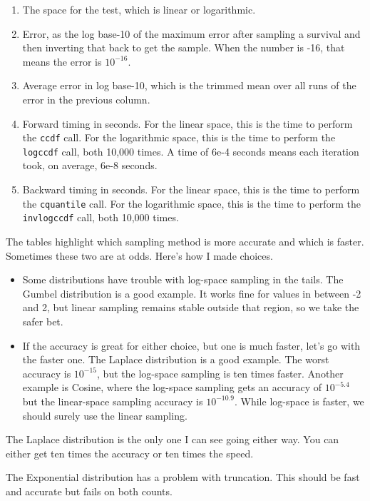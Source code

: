 \documentclass{article}
\begin{document}
\begin{enumerate}
	\item The space for the test, which is linear or logarithmic.

	\item Error, as the log base-10 of the maximum error after sampling a survival and then inverting that back to get the sample. When the number is -16, that means the error is $10^{-16}$.

	\item Average error in log base-10, which is the trimmed mean over all runs of the error in the previous column.

	\item Forward timing in seconds. For the linear space, this is the time to perform the \texttt{ccdf} call. For the logarithmic space, this is the time to perform the \texttt{logccdf} call, both 10,000 times. A time of 6e-4 seconds means each iteration took, on average, 6e-8 seconds.

	\item Backward timing in seconds. For the linear space, this is the time to perform the \texttt{cquantile} call. For the logarithmic space, this is the time to perform the \texttt{invlogccdf} call, both 10,000 times.
\end{enumerate}

\pagebreak


\pagebreak


\pagebreak


The tables highlight which sampling method is more accurate and which is faster. Sometimes these two are at odds. Here's how I made choices.

\begin{itemize}
	\item Some distributions have trouble with log-space sampling in the tails. The Gumbel distribution is a good example. It works fine for values in between -2 and 2, but linear sampling remains stable outside that region, so we take the safer bet.

	\item If the accuracy is great for either choice, but one is much faster, let's go with the faster one. The Laplace distribution is a good example. The worst accuracy is $10^{-15}$, but the log-space sampling is ten times faster. Another example is Cosine, where the log-space sampling gets an accuracy of $10^{-5.4}$ but the linear-space sampling accuracy is $10^{-10.9}$. While log-space is faster, we should surely use the linear sampling.
\end{itemize}

The Laplace distribution is the only one I can see going either way. You can either get ten times the accuracy or ten times the speed.

The Exponential distribution has a problem with truncation. This should be fast and accurate but fails on both counts.
\end{document}
